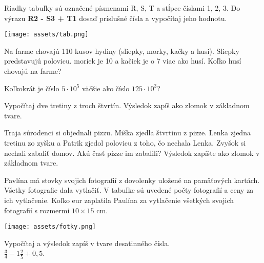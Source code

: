 \begin{example}
	Riadky tabuľky sú označené písmenami R, S, T a stĺpce číslami 1, 2, 3. Do výrazu \textbf{R2 - S3 + T1} dosaď príslušné čísla a vypočítaj jeho hodnotu. \\
	\begin{center}
		\texttt{[image: assets/tab.png]}
	\end{center}
	
\end{example}

\begin{example}
	Na farme chovajú 110 kusov hydiny (sliepky, morky, kačky a husi). Sliepky predstavujú polovicu. moriek je 10 a kačiek je o 7 viac ako husí. Koľko husí chovajú na farme?
\end{example}

\begin{example}
	Koľkokrát je číslo $5 \cdot 10^5$ väčšie ako číslo $125 \cdot 10^3$?
\end{example}

\begin{example}
	Vypočítaj dve tretiny z troch štvrtín. Výsledok zapíš ako zlomok v základnom tvare.
\end{example}

\begin{example}
	Traja súrodenci si objednali pizzu. Miška zjedla štvrtinu z pizze. Lenka zjedna tretinu zo zyšku a Patrik zjedol polovicu z toho, čo nechala Lenka. Zvyšok si nechali zabaliť domov. Akú časť pizze im zabalili? Výsledok zapíšte ako zlomok v základnom tvare. 
\end{example}

\begin{example}
	Pavlína má stovky svojich fotografií z dovolenky uložené na pamäťových kartách. Všetky fotografie dala vytlačiť. V tabuľke sú uvedené počty fotografií a ceny za ich vytlačenie. Koľko eur zaplatila Paulína za vytlačenie všetkých svojich fotografií s rozmermi $10 \times 15$ cm.
	
	\begin{center}
		\texttt{[image: assets/fotky.png]}
	\end{center}
\end{example}

\begin{example}
	Vypočítaj a výsledok zapíš v tvare desatinného čísla.\\ $\frac{3}{4} -1\frac{2}{5} + 0,5$.
\end{example}

